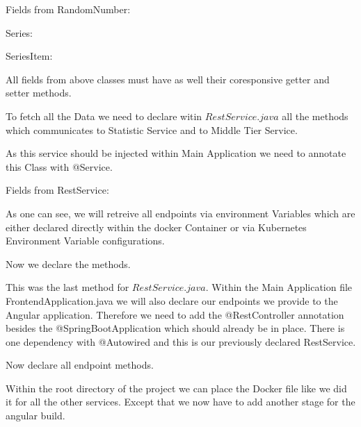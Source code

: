 Fields from RandomNumber:


Series:


SeriesItem:


All fields from above classes must have as well their coresponsive getter and setter methods.

To fetch all the Data we need to declare witin $RestService.java$ all the methods which communicates to Statistic Service and to Middle Tier Service.

As this service should be injected within Main Application we need to annotate this Class with @Service.

Fields from RestService:


As one can see, we will retreive all endpoints via environment Variables which are either declared directly within the docker Container or via Kubernetes Environment Variable configurations.

Now we declare the methods.


This was the last method for  $RestService.java$.
Within the Main Application file FrontendApplication.java we will also declare our endpoints we provide to the Angular application. Therefore we need to add the @RestController annotation besides the @SpringBootApplication which should already be in place.
\newpage
There is one dependency with @Autowired and this is our previously declared RestService.



Now declare all endpoint methods.


Within the root directory of the project we can place the Docker file like we did it for all the other services. Except that we now have to add another stage for the angular build.





